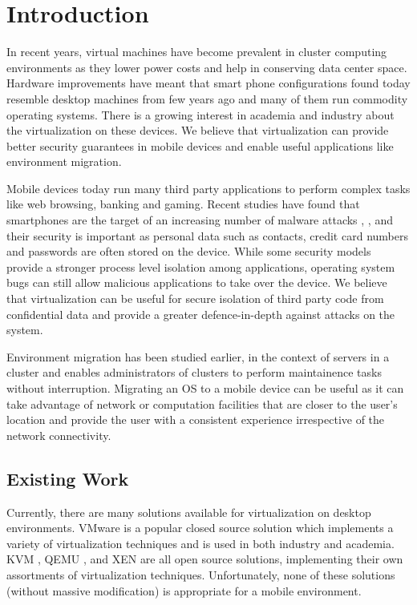 \section{Introduction}
In recent years, virtual machines have become prevalent in cluster computing environments \cite{gartner2009virtual} as they lower power costs and help in conserving data center space. Hardware improvements have meant that smart phone configurations found today resemble desktop machines from few years ago and many of them run commodity operating systems. There is a growing interest in academia \cite{cox2007pocket} and industry \cite{vmware2009nextfrontier} about the virtualization on these devices. We believe that virtualization can provide better security guarantees in mobile devices and enable useful applications like environment migration.

Mobile devices today run many third party applications to perform complex tasks like web browsing, banking and gaming. Recent studies have found that smartphones are the target of an increasing number of malware attacks \cite{bose2006mobile},  \cite{cybercriminals2007banks},  \cite{iphone2010seriot} and their security is important as personal data such as contacts, credit card numbers and passwords are often stored on the device. While some security models \cite{androidsecurity} provide a stronger process level isolation among applications, operating system bugs \cite{kernel2009vulnerability} can still allow malicious applications to take over the device. We believe that virtualization can be useful for secure isolation of third party code from confidential data and provide a greater defence-in-depth against attacks on the system.

Environment migration has been studied earlier, in the context of servers in a cluster \cite{clark2005live} and enables administrators of clusters to perform maintainence tasks without interruption. Migrating an OS to a mobile device can be useful as it can take advantage of network or computation facilities that are closer to the user's location and provide the user with a consistent experience irrespective of the network connectivity. 

\subsection{Existing Work}
Currently, there are many solutions available for virtualization on desktop environments.  VMware is a popular closed source solution which implements a variety of virtualization techniques and is used in both industry and academia.  KVM \cite{kvm}, QEMU \cite{qemu}, and XEN \cite{xen} are all open source solutions, implementing their own assortments of virtualization techniques.  Unfortunately, none of these solutions (without massive modification) is appropriate for a mobile environment.

